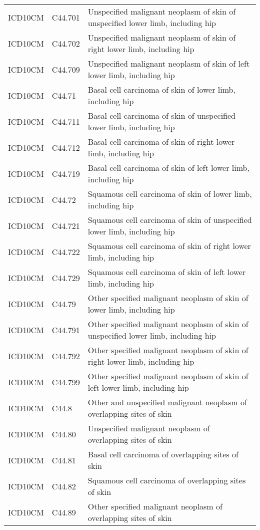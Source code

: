 \begin{longtable}{p{}p{}p{}}
  ICD10CM & C44.701 & Unspecified malignant neoplasm of skin of unspecified lower limb, including hip \\ 
  ICD10CM & C44.702 & Unspecified malignant neoplasm of skin of right lower limb, including hip \\ 
  ICD10CM & C44.709 & Unspecified malignant neoplasm of skin of left lower limb, including hip \\ 
  ICD10CM & C44.71 & Basal cell carcinoma of skin of lower limb, including hip \\ 
  ICD10CM & C44.711 & Basal cell carcinoma of skin of unspecified lower limb, including hip \\ 
  ICD10CM & C44.712 & Basal cell carcinoma of skin of right lower limb, including hip \\ 
  ICD10CM & C44.719 & Basal cell carcinoma of skin of left lower limb, including hip \\ 
  ICD10CM & C44.72 & Squamous cell carcinoma of skin of lower limb, including hip \\ 
  ICD10CM & C44.721 & Squamous cell carcinoma of skin of unspecified lower limb, including hip \\ 
  ICD10CM & C44.722 & Squamous cell carcinoma of skin of right lower limb, including hip \\ 
  ICD10CM & C44.729 & Squamous cell carcinoma of skin of left lower limb, including hip \\ 
  ICD10CM & C44.79 & Other specified malignant neoplasm of skin of lower limb, including hip \\ 
  ICD10CM & C44.791 & Other specified malignant neoplasm of skin of unspecified lower limb, including hip \\ 
  ICD10CM & C44.792 & Other specified malignant neoplasm of skin of right lower limb, including hip \\ 
  ICD10CM & C44.799 & Other specified malignant neoplasm of skin of left lower limb, including hip \\ 
  ICD10CM & C44.8 & Other and unspecified malignant neoplasm of overlapping sites of skin \\ 
  ICD10CM & C44.80 & Unspecified malignant neoplasm of overlapping sites of skin \\ 
  ICD10CM & C44.81 & Basal cell carcinoma of overlapping sites of skin \\ 
  ICD10CM & C44.82 & Squamous cell carcinoma of overlapping sites of skin \\ 
  ICD10CM & C44.89 & Other specified malignant neoplasm of overlapping sites of skin \\ 

\end{longtable}
